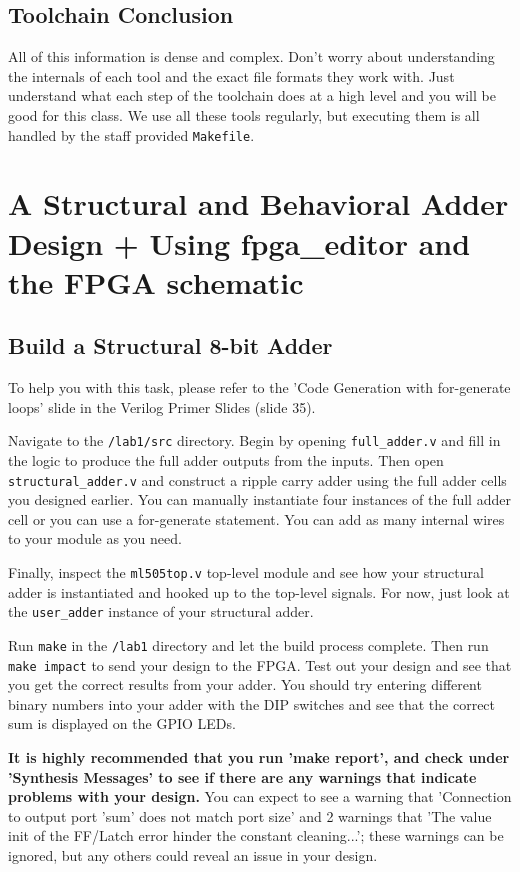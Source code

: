 \documentclass[11pt]{article}
\begin{document}
\subsection{Toolchain Conclusion}
All of this information is dense and complex. Don't worry about understanding the internals of each tool and the exact file formats they work with. Just understand what each step of the toolchain does at a high level and you will be good for this class. We use all these tools regularly, but executing them is all handled by the staff provided \verb|Makefile|.


\section{A Structural and Behavioral Adder Design + Using fpga\_editor and the FPGA schematic}

\subsection{Build a Structural 8-bit Adder}
To help you with this task, please refer to the 'Code Generation with for-generate loops' slide in the Verilog Primer Slides (slide 35).

Navigate to the \verb|/lab1/src| directory. Begin by opening \verb|full_adder.v| and fill in the logic to produce the full adder outputs from the inputs. Then open \verb|structural_adder.v| and construct a ripple carry adder using the full adder cells you designed earlier. You can manually instantiate four instances of the full adder cell or you can use a for-generate statement. You can add as many internal wires to your module as you need.

Finally, inspect the \verb|ml505top.v| top-level module and see how your structural adder is instantiated and hooked up to the top-level signals. For now, just look at the \verb|user_adder| instance of your structural adder.

Run \verb|make| in the \verb|/lab1| directory and let the build process complete. Then run \verb|make impact| to send your design to the FPGA. Test out your design and see that you get the correct results from your adder. You should try entering different binary numbers into your adder with the DIP switches and see that the correct sum is displayed on the GPIO LEDs. 

\textbf{It is highly recommended that you run 'make report', and check under 'Synthesis Messages' to see if there are any warnings that indicate problems with your design.} You can expect to see a warning that 'Connection to output port 'sum' does not match port size' and 2 warnings that 'The value init of the FF/Latch error hinder the constant cleaning...'; these warnings can be ignored, but any others could reveal an issue in your design.
\end{document}
